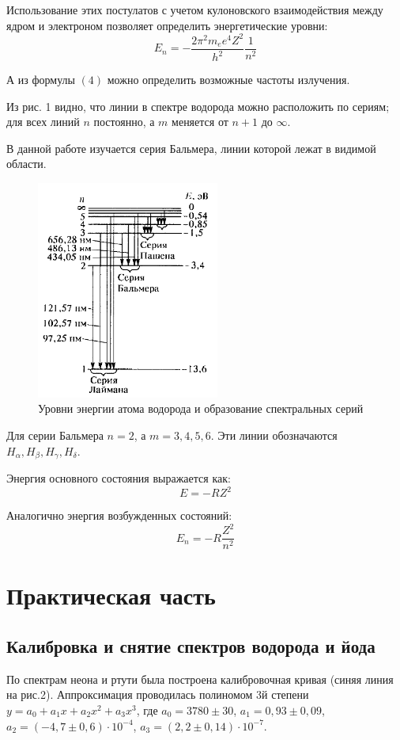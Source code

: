 \documentclass[a4paper, 12pt]{article}
\begin{document}
Использование этих постулатов с учетом кулоновского взаимодействия между ядром и электроном позволяет определить энергетические уровни:
\begin{equation}
E_n = - \frac{2\pi^2m_ee^4Z^2}{h^2}\frac{1}{n^2}
\end{equation}

А из формулы $(4)$ можно определить возможные частоты излучения. 

Из рис. 1 видно, что линии в спектре водорода можно расположить по сериям; для всех линий $n$ постоянно, а $m$ меняется от $n+1$ до $\infty$. 

В данной работе изучается серия Бальмера, линии которой лежат в видимой области. 

\begin{figure}[h]
    \centering
    \includegraphics[width=6cm]{fig3.PNG}
    \caption{Уровни энергии атома водорода и образование спектральных серий}
    \label{fig:vac}
\end{figure}

Для серии Бальмера $n=2$, а $m = 3, 4, 5, 6$. Эти линии обозначаются $H_{\alpha}, H_{\beta}, H_{\gamma}, H_{\delta}$.

Энергия основного состояния выражается как:
\begin{equation}
E = -RZ^2
\end{equation}

Аналогично энергия возбужденных состояний:
\begin{equation}
E_n = -R\frac{Z^2}{n^2}
\end{equation}

\newpage
\section{Практическая часть}
\subsection{Калибровка и снятие спектров водорода и йода}
По спектрам неона и ртути была построена калибровочная кривая (синяя линия на рис.2). Аппроксимация проводилась полиномом 3й степени $y = a_0 + a_1x + a_2x^2 + a_3x^3$, где $a_0 = 3780\pm30$, $a_1 = 0,93\pm0,09$, $a_2 = (-4,7\pm0,6) \cdot 10^{-4}$, $a_3= (2,2 \pm 0,14) \cdot 10^{-7}$. 
\end{document}
